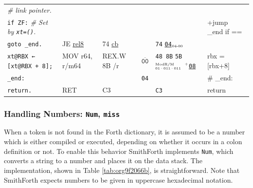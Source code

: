 \documentclass[a4paper,12pt,final]{article}
\begin{document}
\begin{table}[!htbp]
\begin{adjustwidth}{-1cm}{-1cm}
\begin{center}
\begin{tabular}{l|ll|l|lH}
\hspace{1.053000em} \emph{\# link pointer.} &  &  &  &  & \\[0pt]
\hspace{1.053000em} \texttt{if ZF:}  \emph{\# Set by \texttt{xt=()}.} &  &  &  &  & +jump \_end if ==\\[0pt]
\hspace{2.106000em}   \texttt{goto \_end.} & JE \uline{rel8} & 74 \uline{cb} &  & \texttt{74} \uline{\texttt{04}}​\(_{\text{\tiny 04-00}}\) & \\[0pt]
\hspace{1.053000em} \texttt{xt@RBX ← [xt@RBX + 8];} & MOV r64, r/m64 & REX.W 8B /r & \(\overline{\texttt{00}}\) & \texttt{48 8B} \texttt{5B}​\(^{\text{\tiny ModR/M}}_{\text{\tiny 01·011·011}}\) \(^{\text{\tiny +}}\)​\uline{\texttt{08}} & rbx = [rbx+8]\\[0pt]
\texttt{\_end:} &  &  & \texttt{04} &  & \# \_end:\\[0pt]
\hspace{1.053000em} \texttt{return.} & RET & C3 &  & \texttt{C3} & return\\[0pt]
\end{tabular}

\end{center}
\normalsize \end{adjustwidth} \end{table} \vspace{0}
\clearpage

\subsubsection{Handling Numbers: \texttt{Num}, \texttt{miss}}
\label{sec:org34d8514}

When a token is not found in the Forth dictionary, it is assumed to be
a number which is either compiled or executed, depending on whether it
occurs in a colon definition or not.  To enable this behavior
SmithForth implements \texttt{Num}, which converts a string to a number and
places it on the data stack.  The implementation, shown in Table
\ref{tab:org9f2066b}, is straightforward.  Note that SmithForth expects
numbers to be given in uppercase hexadecimal notation.
\end{document}
